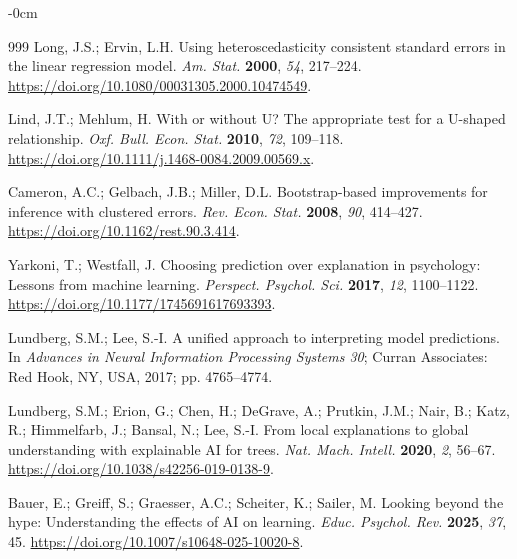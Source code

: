 \documentclass[sustainability,article,accept,moreauthors]{Definitions/mdpi}
\begin{document}
\begin{adjustwidth}{-\extralength}{0cm}
\begin{thebibliography}{999}
Long, J.S.; Ervin, L.H. Using heteroscedasticity consistent standard errors in the linear regression model. \textit{Am. Stat.} \textbf{2000}, \textit{54}, 217--224. \url{https://doi.org/10.1080/00031305.2000.10474549}.

Lind, J.T.; Mehlum, H. With or without U? The appropriate test for a U-shaped relationship. \textit{Oxf. Bull. Econ. Stat.} \textbf{2010}, \textit{72}, 109--118. \url{https://doi.org/10.1111/j.1468-0084.2009.00569.x}.

Cameron, A.C.; Gelbach, J.B.; Miller, D.L. Bootstrap-based improvements for inference with clustered errors. \textit{Rev. Econ. Stat.} \textbf{2008}, \textit{90}, 414--427. \url{https://doi.org/10.1162/rest.90.3.414}.

Yarkoni, T.; Westfall, J. Choosing prediction over explanation in psychology: Lessons from machine learning. \textit{Perspect. Psychol. Sci.} \textbf{2017}, \textit{12}, 1100--1122. \url{https://doi.org/10.1177/1745691617693393}.

Lundberg, S.M.; Lee, S.-I. A unified approach to interpreting model predictions. In \textit{Advances in Neural Information Processing Systems 30}; Curran Associates: Red Hook, NY, USA, 2017; pp. 4765--4774.

Lundberg, S.M.; Erion, G.; Chen, H.; DeGrave, A.; Prutkin, J.M.; Nair, B.; Katz, R.; Himmelfarb, J.; Bansal, N.; Lee, S.-I. From local explanations to global understanding with explainable AI for trees. \textit{Nat. Mach. Intell.} \textbf{2020}, \textit{2}, 56--67. \url{https://doi.org/10.1038/s42256-019-0138-9}.

Bauer, E.; Greiff, S.; Graesser, A.C.; Scheiter, K.; Sailer, M. Looking beyond the hype: Understanding the effects of AI on learning. \textit{Educ. Psychol. Rev.} \textbf{2025}, \textit{37}, 45. \url{https://doi.org/10.1007/s10648-025-10020-8}.

\end{thebibliography}

\PublishersNote{}
\end{adjustwidth}
\end{document}
